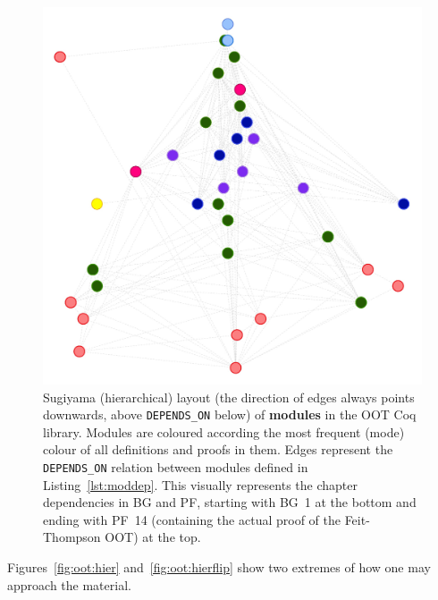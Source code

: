 \begin{figure}[p]
\centering
\includegraphics[height=0.35\textheight]{img/oot/module_hierarchical}
\caption{Sugiyama (hierarchical) layout (the direction of edges always
  points downwards, above \texttt{DEPENDS\_ON} below) of \textbf{modules} in the
  OOT Coq library. Modules are coloured according the most frequent (mode)
  colour of all definitions and proofs in them. Edges represent the
  \texttt{DEPENDS\_ON} relation between modules defined in
  Listing~\ref{lst:moddep}. This visually represents the chapter dependencies in
  BG and PF, starting with BG~1 at the bottom and ending with PF~14 (containing
  the actual proof of the Feit-Thompson OOT) at the top.}\label{fig:oot:modhier}
\end{figure}

Figures~\ref{fig:oot:hier} and~\ref{fig:oot:hierflip} show two extremes of how
one may approach the material. 

